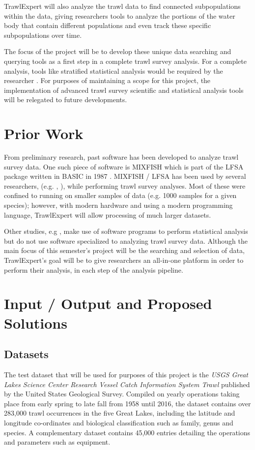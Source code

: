 \documentclass{article}
\begin{document}
TrawlExpert will also analyze the trawl data to find connected subpopulations within the data, giving researchers  tools to analyze the portions of the water body that contain different populations and even track these specific subpopulations over time.

The focus of the project will be to develop these unique data searching and querying tools as a first step in a complete trawl survey analysis. For a complete analysis, tools like stratified statistical analysis would be required by the researcher \citep{walsh1997efficiency}. For purposes of maintaining a scope for this project, the implementation of advanced trawl survey scientific and statistical analysis tools will be relegated to future developments. 

\section{Prior Work}
From preliminary research, past software has been developed to analyze trawl survey data. One such piece of software is MIXFISH which is part of the LFSA package written in BASIC in 1987 \citep{sparre1987computer}. MIXFISH / LFSA has been used by several researchers, (e.g. \cite{levi1993analysis}, \cite{chakraborty1996stock}), while performing trawl survey analyses. Most of these were confined to running on smaller samples of data (e.g. 1000 samples for a given species); however, with modern hardware and using a modern programming language, TrawlExpert will allow processing of much larger datasets.

Other studies, e.g \cite{swartzman1992spatial}, make use of software programs to perform statistical analysis but do not use software specialized to analyzing trawl survey data. Although the main focus of this semester's project will be the searching and selection of data, TrawlExpert's goal will be to give researchers an all-in-one platform in order to perform their analysis, in each step of the analysis pipeline.

\section{Input / Output and Proposed Solutions}
\subsection{Datasets}\label{sec:out}
The test dataset that will be used for purposes of this project is the \textit{USGS Great Lakes Science Center Research Vessel Catch Information System Trawl} published by the United States Geological Survey. Compiled on yearly operations taking place from early spring to late fall from 1958 until 2016, the dataset contains over 283,000 trawl occurrences in the five Great Lakes, including the latitude and longitude co-ordinates and biological classification such as family, genus and species. A complementary dataset contains 45,000 entries detailing the operations and parameters such as equipment.
\end{document}
